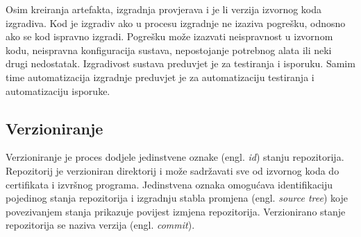 \documentclass[times, utf8, diplomski, numeric]{fer}
\newcommand{\eng}[1]{(engl. \textit{#1})}
\begin{document}
Osim kreiranja artefakta, izgradnja provjerava i je li verzija izvornog koda izgradiva. Kod je izgradiv ako u procesu izgradnje ne izaziva pogrešku, odnosno ako se kod ispravno izgradi. Pogrešku može izazvati neispravnost u izvornom kodu, neispravna konfiguracija sustava, nepostojanje potrebnog alata ili neki drugi nedostatak. Izgradivost sustava preduvjet je za testiranja i isporuku. Samim time automatizacija izgradnje preduvjet je za automatizaciju testiranja i automatizaciju isporuke.

\subsection{Verzioniranje} \label{header:Verzioniranje}

Verzioniranje je proces dodjele jedinstvene oznake \eng{id} stanju repozitorija. Repozitorij je verzioniran direktorij i može sadržavati sve od izvornog koda do certifikata i izvršnog programa. Jedinstvena oznaka omogućava identifikaciju pojedinog stanja repozitorija i izgradnju stabla promjena \eng{source tree} koje povezivanjem stanja prikazuje povijest izmjena repozitorija. Verzionirano stanje repozitorija se naziva verzija \eng{commit}\citep{wiki:SoftwareVersioning}.
\end{document}
